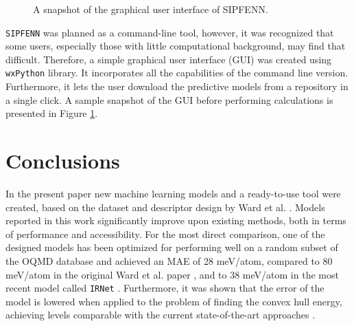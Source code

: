 \begin{figure}[H]
    \centering
    \caption{A snapshot of the graphical user interface of SIPFENN.}
    \label{sipfenn:fig:sipfennGUI}
\end{figure}

\texttt{SIPFENN} was planned as a command-line tool, however, it was recognized that some users, especially those with little computational background, may find that difficult. Therefore, a simple graphical user interface (GUI) was created using \texttt{wxPython} library. It incorporates all the capabilities of the command line version. Furthermore, it lets the user download the predictive models from a repository in a single click. A sample snapshot of the GUI before performing calculations is presented in Figure \ref{sipfenn:fig:sipfennGUI}.

\section{Conclusions} \label{sipfenn:ssec:Conclusions}
In the present paper new machine learning models and a ready-to-use tool were created, based on the dataset and descriptor design by Ward et al. \cite{Ward2017IncludingTessellations}. Models reported in this work significantly improve upon existing methods, both in terms of performance and accessibility. For the most direct comparison, one of the designed models has been optimized for performing well on a random subset of the OQMD database and achieved an MAE of 28 meV/atom, compared to 80 meV/atom in the original  Ward et al. paper \cite{Ward2017IncludingTessellations}, and to 38 meV/atom in the most recent model called \texttt{IRNet} \cite{Jha2019IRNet}. Furthermore, it was shown that the error of the model is lowered when applied to the problem of finding the convex hull energy, achieving levels comparable with the current state-of-the-art approaches \cite{Jha2018ElemNet:Composition, Goodall2020PredictingStoichiometry}.

